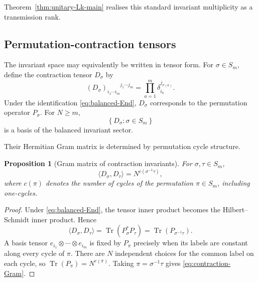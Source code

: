\documentclass[11pt]{article}
\theoremstyle{plain}
\newtheorem{proposition}[theorem]{Proposition}
\theoremstyle{definition}
\begin{document}
Theorem~\ref{thm:unitary-Lk-main} realises this standard invariant multiplicity as a transmission rank.

\subsection{Permutation-contraction tensors}
\label{subsec:permutation-contractions}

The invariant space may equivalently be written in tensor form. For
\(\sigma\in S_m\),
define the contraction tensor \(D_\sigma\) by
\begin{equation}
\label{eq:D-sigma-components}
(D_\sigma)_{i_1\cdots i_m}^{\phantom{i_1\cdots i_m}j_1\cdots j_m}
=
\prod_{a=1}^{m}
\delta_{i_a}^{j_{\sigma(a)}}.
\end{equation}
Under the identification \eqref{eq:balanced-End}, \(D_\sigma\) corresponds
to the permutation operator \(P_\sigma\). For \(N\geq m\),
\[
\left\{
D_\sigma:\sigma\in S_m
\right\}
\]
is a basis of the balanced invariant sector.

Their Hermitian Gram matrix is determined by permutation cycle structure.

\begin{proposition}[Gram matrix of contraction invariants]
\label{prop:contraction-Gram}
For \(\sigma,\tau\in S_m\),
\begin{equation}
\label{eq:contraction-Gram}
\langle D_\sigma,D_\tau\rangle
=
N^{c(\sigma^{-1}\tau)},
\end{equation}
where \(c(\pi)\) denotes the number of cycles of the permutation
\(\pi\in S_m\), including one-cycles.
\end{proposition}

\begin{proof}
Under \eqref{eq:balanced-End}, the tensor inner product becomes the
Hilbert--Schmidt inner product. Hence
\[
\langle D_\sigma,D_\tau\rangle
=
\operatorname{Tr}(P_\sigma^\ast P_\tau)
=
\operatorname{Tr}(P_{\sigma^{-1}\tau}).
\]
A basis tensor \(e_{i_1}\otimes\cdots\otimes e_{i_m}\) is fixed by \(P_\pi\) precisely when its labels are constant along every
cycle of \(\pi\). There are \(N\) independent choices for the common label
on each cycle, so
\(\operatorname{Tr}(P_\pi) = N^{c(\pi)}\).
Taking \(\pi=\sigma^{-1}\tau\) gives \eqref{eq:contraction-Gram}.
\end{proof}
\end{document}
